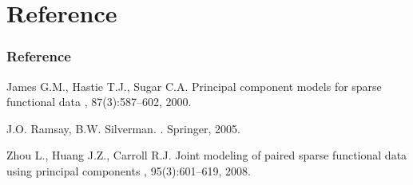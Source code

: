 \documentclass{beamer}
\begin{document}
\appendix
\section{Reference}
\begin{frame}
  \frametitle<presentation>{Reference}
    
  \begin{thebibliography}{10}
  	\beamertemplatearticlebibitems
		James G.M., Hastie T.J., Sugar C.A.
		\newblock Principal component models for sparse functional data
		, 87(3):587--602,
		2000.
    
  \beamertemplatebookbibitems
		J.O. Ramsay, B.W. Silverman.
		.
		\newblock Springer, 2005.
		
   	\beamertemplatearticlebibitems
		 Zhou L., Huang J.Z., Carroll R.J.
		 \newblock Joint modeling of paired sparse functional data using principal components
		 , 95(3):601--619,
		 2008.
    

  \end{thebibliography}
\end{frame}


%
%    
%    
%
% 
%    
%
\end{document}
